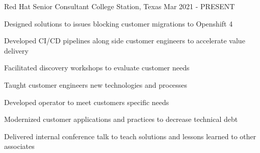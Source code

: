 

\begin{cventries}

\cventry
{Red Hat} %
{Senior Consultant} %
{College Station, Texas} %
{Mar 2021 - PRESENT} %
{
  \begin{cvitems} %
    \item {Designed solutions to issues blocking customer migrations to Openshift 4}
    \item {Developed CI/CD pipelines along side customer engineers to accelerate value delivery}
    \item {Facilitated discovery workshops to evaluate customer needs}
    \item {Taught customer engineers new technologies and processes}
    \item {Developed operator to meet customers specific needs}
    \item {Modernized customer applications and practices to decrease technical debt}
    \item {Delivered internal conference talk to teach solutions and lessons learned to other associates}
  \end{cvitems}
}


\end{cventries}
